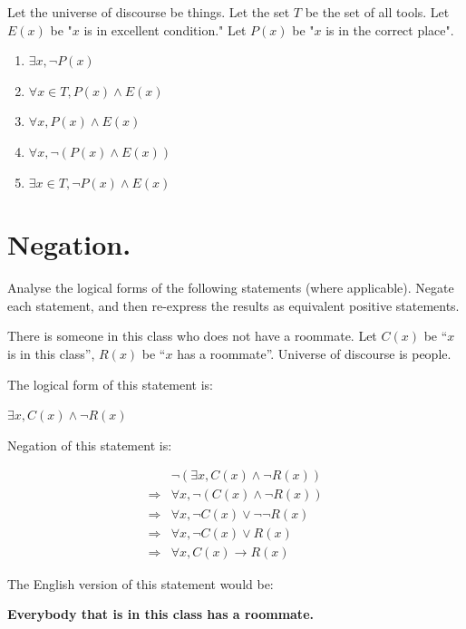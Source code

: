 \documentclass[]{article}
\begin{document}
Let the universe of discourse be things. Let the set $T$ be the set of all tools. Let $E(x)$ be "$x$ is in excellent condition."
Let $P(x)$ be "$x$ is in the correct place".

\begin{enumerate}[label=\textbf{\arabic*.}]
    \item $\exists x, \neg P(x)$
    \item $\forall x \in T, P(x) \land E(x)$
    \item $\forall x, P(x) \land E(x)$
    \item $\forall x, \neg(P(x) \land E(x))$
    \item $\exists x \in T, \neg P(x) \land E(x)$
\end{enumerate}

\section*{Negation.}

Analyse the logical forms of the following statements (where applicable). Negate each statement,
and then re-express the results as equivalent positive statements.

\begin{question}{1}
    There is someone in this class who does not have a roommate. Let $C(x)$ be “$x$ is in this class”,
    $R(x)$ be “$x$ has a roommate”. Universe of discourse is people.
\end{question}

The logical form of this statement is:

\begin{center}
    $\exists x, C(x) \land \neg R(x)$
\end{center}

Negation of this statement is:

\begin{align*}
    & \neg(\exists x, C(x) \land \neg R(x)) \\
    \Rightarrow & \forall x, \neg(C(x) \land \neg R(x)) \\
    \Rightarrow & \forall x, \neg C(x) \lor \neg\neg R(x) \\
    \Rightarrow & \forall x, \neg C(x) \lor R(x) \\
    \Rightarrow & \forall x, C(x) \rightarrow R(x)
\end{align*}

The English version of this statement would be:

\begin{center}
    \bf{Everybody that is in this class has a roommate.}
\end{center}
\end{document}

